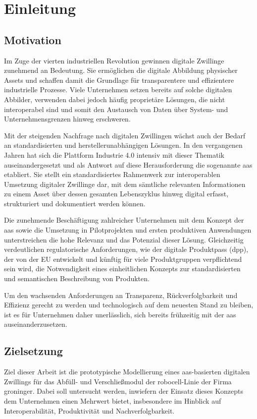 \section{Einleitung}
\subsection{Motivation}
\label{sec:Motivation}
Im Zuge der vierten industriellen Revolution gewinnen digitale Zwillinge zunehmend an Bedeutung. 
Sie ermöglichen die digitale Abbildung physischer Assets und schaffen damit die Grundlage für transparentere und effizientere industrielle Prozesse.
Viele Unternehmen setzen bereits auf solche digitalen Abbilder, verwenden dabei jedoch häufig proprietäre Lösungen, die nicht interoperabel sind und somit den Austausch von Daten über System- und Unternehmensgrenzen hinweg erschweren. 

Mit der steigenden Nachfrage nach digitalen Zwillingen wächst auch der Bedarf an standardisierten und herstellerunabhängigen Lösungen. 
In den vergangenen Jahren hat sich die Plattform Industrie 4.0 intensiv mit dieser Thematik auseinandergesetzt und als Antwort auf diese Herausforderung die sogenannte \ac{aas} etabliert.
Sie stellt ein standardisiertes Rahmenwerk zur interoperablen Umsetzung digitaler Zwillinge dar, mit dem sämtliche relevanten Informationen zu einem Asset über dessen gesamten Lebenszyklus hinweg digital erfasst, strukturiert und dokumentiert werden können.

Die zunehmende Beschäftigung zahlreicher Unternehmen mit dem Konzept der \acs{aas} sowie die Umsetzung in Pilotprojekten und ersten produktiven Anwendungen unterstreichen die hohe Relevanz und das Potenzial dieser Lösung. 
Gleichzeitig verdeutlichen regulatorische Anforderungen, wie der digitale Produktpass (\acs{dpp}), der von der EU entwickelt und künftig für viele Produktgruppen verpflichtend sein wird, die Notwendigkeit eines einheitlichen Konzepts zur standardisierten und semantischen Beschreibung von Produkten.

Um den wachsenden Anforderungen an Transparenz, Rückverfolgbarkeit und Effizienz gerecht zu werden und technologisch auf dem neuesten Stand zu bleiben, ist es für Unternehmen daher unerlässlich, sich bereits frühzeitig mit der \acs{aas} auseinanderzusetzen.

\subsection{Zielsetzung}
Ziel dieser Arbeit ist die prototypische Modellierung eines \acs{aas}-basierten digitalen Zwillings für das Abfüll- und Verschließmodul der robocell-Linie der Firma groninger. 
Dabei soll untersucht werden, inwiefern der Einsatz dieses Konzepts dem Unternehmen einen Mehrwert bietet, insbesondere im Hinblick auf Interoperabilität, Produktivität und Nachverfolgbarkeit.

